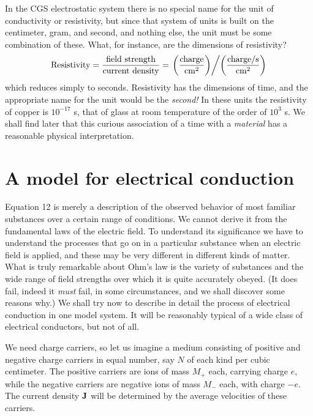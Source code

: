 In the CGS electrostatic system there is no special name for the
unit of conductivity or resistivity, but since that system of units is
built on the centimeter, gram, and second, and nothing else, the unit
must be some combination of these. What, for instance, are the
dimensions of resistivity?
\begin{equation}
  \text{Resistivity} = \frac{\text{field strength}}{\text{current density}}
    = \left. 
        \left(\frac{\text{charge}}{\textup{cm}^2}\right)
      \middle/ 
        \left(\frac{\text{charge}/\textup{s}}{\textup{cm}^2}\right)
      \right.
\end{equation}
which reduces simply to seconds. Resistivity has the dimensions of
time, and the appropriate name for the unit would be the \emph{second!}
In these units the resistivity of copper is $10^{-17}$ s, that of glass at
room temperature of the order of $10^3$ s. We shall find later that
this curious association of a time with a \emph{material} has a reasonable
physical interpretation.

\section{A model for electrical conduction}

Equation 12 is merely a description of the observed behavior of
most familiar substances over a certain range of conditions. We
cannot derive it from the fundamental laws of the electric field. To
understand its significance we have to understand the processes that
go on in a particular substance when an electric field is applied, and
these may be very different in different kinds of matter. What is
truly remarkable about Ohm's law is the variety of substances and
the wide range of field strengths over which it is quite accurately
obeyed. (It does fail, indeed it \emph{must} fail, in some circumstances, and
we shall discover some reasons why.) We shall try now to describe
in detail the process of electrical conduction in one model system.
It will be reasonably typical of a wide class of electrical conductors,
but not of all.

We need charge carriers, so let us imagine a medium consisting of
positive and negative charge carriers in equal number, say $N$ of each
kind per cubic centimeter. The positive carriers are ions of mass $M_+$
each, carrying charge $e$, while the negative carriers are negative ions
of mass $M_-$ each, with charge $-e$. The current density $\mathbf{J}$ will be
determined by the average velocities of these carriers.

